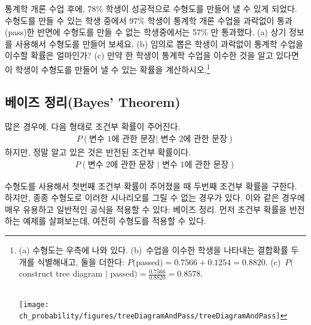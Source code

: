 \begin{exercise}
통계학 개론 수업 후에, 78\% 학생이 성공적으로 수형도를 만들어 낼 수 있게 되었다. 수형도를 만들 수 있는 학생 중에서 97\% 학생이 통계학 개론 수업을 과락없이 통과(pass)한 반면에 수형도를 만들 수 없는 학생중에서는 57\% 만 통과했다. 
(a) 상기 정보를 사용해서 수형도를 만들어 보세요. (b) 임의로 뽑은 학생이 과락없이 통계학 수업을 이수할 확률은 얼마인가?
(c) 만약 한 학생이 통계학 수업을 이수한 것을 알고 있다면 이 학생이 수형도를 만들어 낼 수 있는 확률을 계산하시오.\footnote{\begin{minipage}[t]{0.47\linewidth}
(a) 수형도는 우측에 나와 있다. 
(b)~수업을 이수한 학생을 나타내는 결합확률 두개를 식별해내고, 둘을 더한다: $P($passed$) = 0.7566+0.1254= 0.8820$. 
(c)~$P($construct tree diagram $|$ passed$) = \frac{0.7566}{0.8820} = 0.8578$. \vspace{15mm} \\\ 
\end{minipage}
\begin{minipage}[c]{0.5\linewidth}
\texttt{[image: ch\_probability/figures/treeDiagramAndPass/treeDiagramAndPass]} \vspace{-25mm}
\end{minipage}}
\end{exercise}


\subsection{베이즈 정리(Bayes' Theorem)}
\label{bayesTheoremSubsection}


많은 경우에, 다음 형태로 조건부 확률이 주어진다.
\begin{align*}
P(\text{변수 1에 관한 문장} | \text{ 변수 2에 관한 문장})
\end{align*}
하지만, 정말 알고 있은 것은 반전된 조건부 확률이다.
\begin{align*}
P(\text{변수 2에 관한 문장 } | \text{ 변수 1에 관한 문장})
\end{align*}

수형도를 사용해서 첫번째 조건부 확률이 주어졌을 때 두번째 조건부 확률을 구한다. 하지만, 종종 수형도로 이러한 시나리오를 그릴 수 없는 경우가 있다. 이와 같은 경우에 매우 유용하고 일반적인 공식을 적용할 수 있다: 베이즈 정리.
먼저 조건부 확률을 반전하는 예제를 살펴보는데, 여전히 수형도를 적용할 수 있다.


